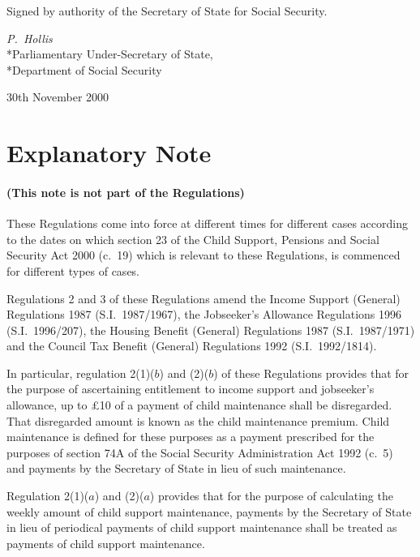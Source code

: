 \documentclass[12pt,a4paper]{article}
\begin{document}
\bigskip

Signed 
by authority of the Secretary of State for Social Security.

{\raggedleft
\emph{P.~Hollis}\\*Parliamentary Under-Secretary of State,\\*Department of Social Security

}

30th November 2000

\small

\part{Explanatory Note}

\renewcommand\parthead{--- Explanatory Note}

\subsection*{(This note is not part of the Regulations)}

These Regulations come into force at different times for different cases according to the dates on which section 23 of the Child Support, Pensions and Social Security Act 2000 (c.\ 19) which is relevant to these Regulations, is commenced for different types of cases.

Regulations 2 and 3 of these Regulations amend the Income Support (General) Regulations 1987 (S.I.\ 1987/1967), the Jobseeker’s Allowance Regulations 1996 (S.I.\ 1996/207), the Housing Benefit (General) Regulations 1987 (S.I.\ 1987/1971) and the Council Tax Benefit (General) Regulations 1992 (S.I.\ 1992/1814).

In particular, regulation 2(1)($b$)  and (2)($b$)  of these Regulations provides that for the purpose of ascertaining entitlement to income support and jobseeker’s allowance, up to £10 of a payment of child maintenance shall be disregarded. That disregarded amount is known as the child maintenance premium. Child maintenance is defined for these purposes as a payment prescribed for the purposes of section 74A of the Social Security Administration Act 1992 (c.\ 5) and payments by the Secretary of State in lieu of such maintenance.

Regulation 2(1)($a$)  and (2)($a$)  provides that for the purpose of calculating the weekly amount of child support maintenance, payments by the Secretary of State in lieu of periodical payments of child support maintenance shall be treated as payments of child support maintenance.
\end{document}
